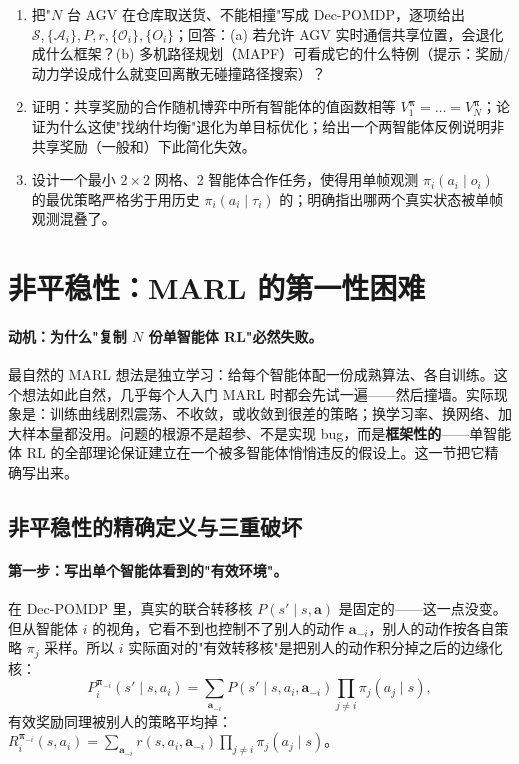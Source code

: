 \begin{practice}
\begin{enumerate}
  \item 把"$N$ 台 AGV 在仓库取送货、不能相撞"写成 Dec-POMDP，逐项给出 $\mathcal{S},\{\mathcal{A}_i\},P,r,\{\mathcal{O}_i\},\{O_i\}$；回答：(a) 若允许 AGV 实时通信共享位置，会退化成什么框架？(b) 多机路径规划（MAPF）可看成它的什么特例（提示：奖励/动力学设成什么就变回离散无碰撞路径搜索）？
  \item 证明：共享奖励的合作随机博弈中所有智能体的值函数相等 $V_1^{\boldsymbol{\pi}}=\dots=V_N^{\boldsymbol{\pi}}$；论证为什么这使"找纳什均衡"退化为单目标优化；给出一个两智能体反例说明非共享奖励（一般和）下此简化失效。
  \item 设计一个最小 $2\times2$ 网格、2 智能体合作任务，使得用单帧观测 $\pi_i(a_i\mid o_i)$ 的最优策略严格劣于用历史 $\pi_i(a_i\mid\tau_i)$ 的；明确指出哪两个真实状态被单帧观测混叠了。
\end{enumerate}
\end{practice}

\section{非平稳性：MARL 的第一性困难}
\label{sec:sm-nonstationary}

\paragraph{动机：为什么"复制 $N$ 份单智能体 RL"必然失败。}
最自然的 MARL 想法是独立学习：给每个智能体配一份成熟算法、各自训练。这个想法如此自然，几乎每个人入门 MARL 时都会先试一遍——然后撞墙。实际现象是：训练曲线剧烈震荡、不收敛，或收敛到很差的策略；换学习率、换网络、加大样本量都没用。问题的根源不是超参、不是实现 bug，而是\textbf{框架性的}——单智能体 RL 的全部理论保证建立在一个被多智能体悄悄违反的假设上。这一节把它精确写出来。

\subsection{非平稳性的精确定义与三重破坏}

\paragraph{第一步：写出单个智能体看到的"有效环境"。}
在 Dec-POMDP 里，真实的联合转移核 $P(s'\mid s,\mathbf{a})$ 是固定的——这一点没变。但从智能体 $i$ 的视角，它看不到也控制不了别人的动作 $\mathbf{a}_{-i}$，别人的动作按各自策略 $\pi_j$ 采样。所以 $i$ 实际面对的"有效转移核"是把别人的动作积分掉之后的边缘化核：
\begin{equation}
  P_i^{\boldsymbol{\pi}_{-i}}(s'\mid s,a_i)=\sum_{\mathbf{a}_{-i}}P(s'\mid s,a_i,\mathbf{a}_{-i})\prod_{j\neq i}\pi_j(a_j\mid s),
  \label{eq:sm-effective-core}
\end{equation}
有效奖励同理被别人的策略平均掉：$R_i^{\boldsymbol{\pi}_{-i}}(s,a_i)=\sum_{\mathbf{a}_{-i}}r(s,a_i,\mathbf{a}_{-i})\prod_{j\neq i}\pi_j(a_j\mid s)$。

